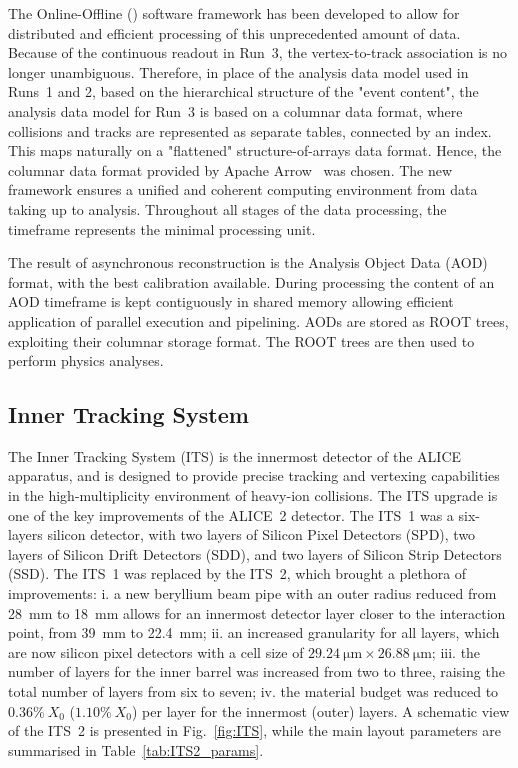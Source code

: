 The Online-Offline (\osq) software framework has been developed to allow for distributed and efficient processing of this unprecedented amount of data. Because of the continuous readout in Run~3, the vertex-to-track association is no longer unambiguous. Therefore, in place of the analysis data model used in Runs~1 and 2, based on the hierarchical structure of the "event content", the analysis data model for Run~3 is based on a columnar data format, where collisions and tracks are represented as separate tables, connected by an index. This maps naturally on a "flattened" structure-of-arrays data format. Hence, the columnar data format provided by Apache Arrow~\cite{ApacheArrow} was chosen. The new framework ensures a unified and coherent computing environment from data taking up to analysis. Throughout all stages of the data processing, the timeframe represents the minimal processing unit. 

The result of asynchronous reconstruction is the Analysis Object Data (AOD) format, with the best calibration available. During processing the content of an AOD timeframe is kept contiguously in shared memory allowing efficient application of parallel execution and pipelining. AODs are stored as ROOT trees, exploiting their columnar storage format. The ROOT trees are then used to perform physics analyses. 

\subsection{Inner Tracking System}
The Inner Tracking System (ITS) is the innermost detector of the ALICE apparatus, and is designed to provide precise tracking and vertexing capabilities in the high-multiplicity environment of heavy-ion collisions. The ITS upgrade is one of the key improvements of the ALICE~2 detector. The ITS~1 was a six-layers silicon detector, with two layers of Silicon Pixel Detectors (SPD), two layers of Silicon Drift Detectors (SDD), and two layers of Silicon Strip Detectors (SSD). The ITS~1 was replaced by the ITS~2, which brought a plethora of improvements: i. a new beryllium beam pipe with an outer radius reduced from 28~mm to 18~mm allows for an innermost detector layer closer to the interaction point, from 39~mm to 22.4~mm; ii. an increased granularity for all layers, which are now silicon pixel detectors with a cell size of $\SI{29.24}{\micro\meter}\times\SI{26.88}{\micro\meter}$; iii. the number of layers for the inner barrel was increased from two to three, raising the total number of layers from six to seven; iv. the material budget was reduced to $0.36\%~X_0$ ($1.10\%~X_0$) per layer for the innermost (outer) layers. A schematic view of the ITS~2 is presented in Fig.~\ref{fig:ITS}, while the main layout parameters are summarised in Table~\ref{tab:ITS2_params}.

